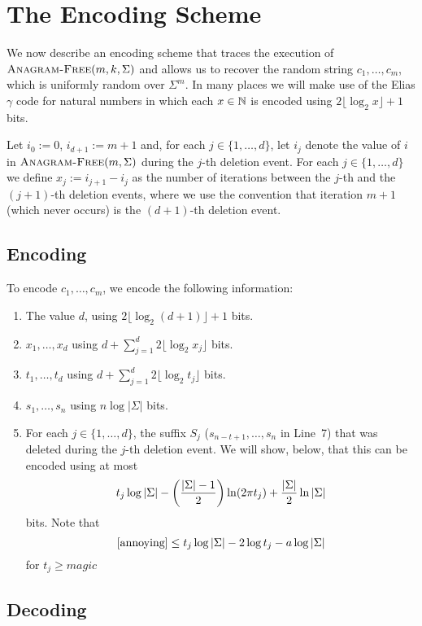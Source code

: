 \documentclass{patmorin}
\newcommand{\floor}[1]{\lfloor #1\rfloor}
\begin{document}
\section{The Encoding Scheme}

We now describe an encoding scheme that traces the execution of $\textsc{Anagram-Free}(m, k, \Sigma)$ and allows us to recover the random string $c_1,\ldots,c_m$, which is uniformly random over $\Sigma^m$.  In many places we will make use of the Elias $\gamma$ code for natural numbers in which each $x\in\mathbb{N}$ is encoded using $2\floor{\log_2 x}+1$ bits.

Let $i_0:=0$, $i_{d+1}:=m+1$ and, for each $j\in\{1,\ldots,d\}$,
let $i_j$ denote the value of $i$ in $\textsc{Anagram-Free}(m, \Sigma)$ during the $j$-th deletion event.  For each $j\in\{1,\ldots,d\}$ we define $x_j:=i_{j+1}-i_{j}$ as the number of iterations between the $j$-th and the $(j+1)$-th deletion events, where we use the convention that iteration $m+1$ (which never occurs) is the $(d+1)$-th deletion event.

\subsection{Encoding}

To encode $c_1,\ldots,c_m$, we encode the following information:
\begin{enumerate}
  \item The value $d$, using $2\floor{\log_2(d+1)}+1$ bits.
  \item $x_1,\ldots,x_d$ using $d+\sum_{j=1}^d 2\floor{\log_2x_j}$ bits.
  \item $t_1,\ldots,t_d$ using $d+\sum_{j=1}^d 2\floor{\log_2 t_j}$ bits.
  \item $s_1,\ldots,s_n$ using $n\log|\Sigma|$ bits.
  \item For each $j\in\{1,\ldots,d\}$, the suffix $S_j$ ($s_{n-t+1},\ldots,s_n$ in Line~7) that was deleted during the $j$-th deletion event.  We will show, below, that this can be encoded using at most  
  \begin{equation}   t_j\log|\Sigma| - \left(\frac{|\Sigma|-1}{2}\right)\ln(2\pi t_j) + \frac{|\Sigma|}{2}\ln |\Sigma| \eqlabel{annoying}
  \end{equation}
   bits.  Note that
   \[  \eqref{annoying} \le t_j\log|\Sigma| - 2\log t_j - a\log|\Sigma| \]
   for $t_j \ge magic$ 
\end{enumerate}

\subsection{Decoding}
\end{document}
